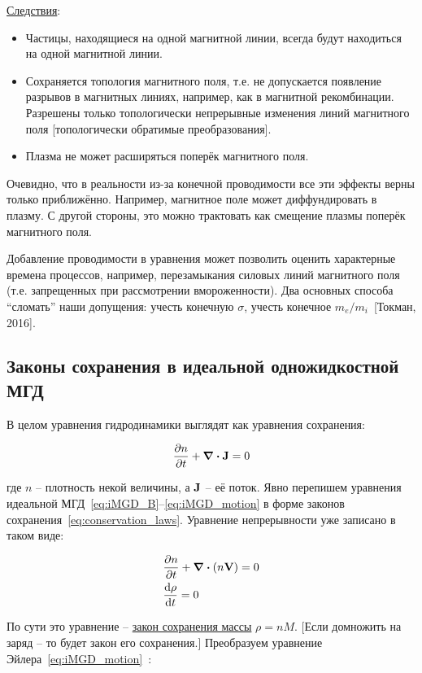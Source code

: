 \documentclass[10pt, a4paper]{article}
\newcommand{\Tokman}{~[Токман, 2016]}
\begin{document}
\uline{Следствия}:

\begin{itemize}
	\item Частицы, находящиеся на одной магнитной линии, всегда будут находиться на одной магнитной линии.
	\item Сохраняется топология магнитного поля, т.е. не допускается появление разрывов в магнитных линиях, например, как в магнитной рекомбинации. Разрешены только топологически непрерывные изменения линий магнитного поля [топологически обратимые преобразования].
	\item Плазма не может расширяться поперёк магнитного поля.
\end{itemize}

Очевидно, что в реальности из-за конечной проводимости все эти эффекты верны только приближённо. Например, магнитное поле может диффундировать в плазму. С другой стороны, это можно трактовать как смещение плазмы поперёк магнитного поля.

Добавление проводимости в уравнения может позволить оценить характерные времена процессов, например, перезамыкания силовых линий магнитного поля (т.е. запрещенных при рассмотрении вмороженности). Два основных способа ``сломать'' наши допущения: учесть конечную $\sigma$, учесть конечное $m_e/m_i$\Tokman.

\subsection{Законы сохранения в идеальной одножидкостной МГД}

В целом уравнения гидродинамики выглядят как уравнения сохранения:

\begin{equation}
	\label{eq:conservation_laws}
	\pdv{n}{t} + \div{\vb{J}} = 0
\end{equation}

где $n$ -- плотность некой величины, а $\vb{J}$ -- её поток.
Явно перепишем уравнения идеальной МГД~\eqref{eq:iMGD_B}--\eqref{eq:iMGD_motion} в форме законов сохранения~\eqref{eq:conservation_laws}. Уравнение непрерывности уже записано в таком виде:

\begin{align}
	\label{eq:conservation_laws_1}
	&\pdv{n}{t} + \divergence{\left( n\vb{V} \right)} = 0 \\
	&\dv{\rho}{t} = 0
\end{align}

По сути это уравнение -- \uline{закон сохранения массы} $\rho = nM$. [Если домножить на заряд -- то будет закон его сохранения.]
Преобразуем уравнение Эйлера~\eqref{eq:iMGD_motion}~\cite{kotelnikov}:
\end{document}

